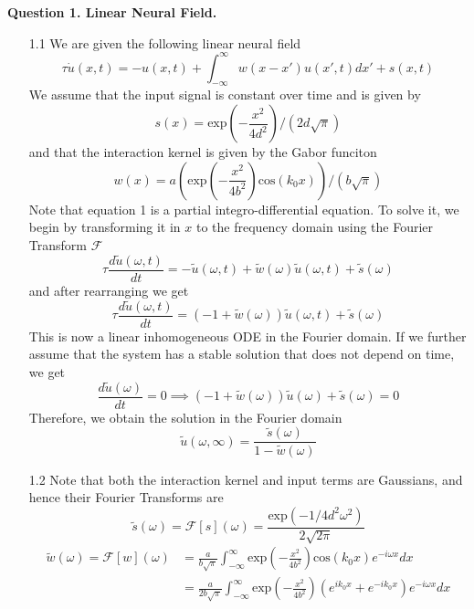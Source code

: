 \documentclass[12pt]{article}
\begin{document}
\noindent


\noindent\textbf{Question 1. Linear Neural Field.}
\begin{enumerate}
\item[1.1] We are given the following linear neural field
\begin{equation}
    \tau \dot{u}(x, t) =   -u(x, t) + \int_{-\infty}^{\infty}w(x-x')u(x', t)dx' + s(x, t)
\end{equation}
We assume that the input signal is constant over time and is given by 
\begin{equation}
    s(x) = \text{exp}\left(-\frac{x^2}{4d^2}\right)/(2d\sqrt{\pi})
\end{equation}
and that the interaction kernel is given by the Gabor funciton
\begin{equation}
    w(x) = a\left(\text{exp}\left(-\frac{x^2}{4b^2}\right)\text{cos}(k_{0}x)\right)/(b\sqrt{\pi})
\end{equation}
Note that equation 1 is a partial integro-differential equation. To solve it, we begin by transforming it in $x$ to the 
frequency domain using the Fourier Transform $\mathcal{F}$
\[
    \tau \frac{d\widetilde{u}(\omega, t)}{dt} = -\widetilde{u}(\omega, t) + \widetilde{w}(\omega)\widetilde{u}(\omega, t) + \widetilde{s}(\omega)
\]
and after rearranging we get
\[
    \tau \frac{d\widetilde{u}(\omega, t)}{dt} = (-1 + \widetilde{w}(\omega))\widetilde{u}(\omega, t) + \widetilde{s}(\omega)
\]
This is now a linear inhomogeneous ODE in the Fourier domain. If we further assume that the system has a stable solution that does not depend on time,
we get
\[
    \frac{d\widetilde{u}(\omega)}{dt} = 0 \implies (-1 + \widetilde{w}(\omega))\widetilde{u}(\omega) + \widetilde{s}(\omega) = 0
\]
Therefore, we obtain the solution in the Fourier domain
\[
    \widetilde{u}(\omega, \infty) = \frac{\widetilde{s}(\omega)}{1 - \widetilde{w}(\omega)}
\]
\item[1.2] Note that both the interaction kernel and input terms are Gaussians, and hence their Fourier Transforms are 
\[
    \widetilde{s}(\omega) = \mathcal{F}[s](\omega) =  \frac{\text{exp}(-1/4d^{2}\omega^{2})}{2\sqrt{2\pi}}
\]
\begin{align*}
    \widetilde{w}(\omega) = \mathcal{F}[w](\omega) &= \frac{a}{b\sqrt{\pi}}\int_{-\infty}^{\infty}\text{exp}\left(-\frac{x^2}{4b^{2}}\right)\text{cos}(k_{0}x)e^{-i\omega x}dx\\
                           &= \frac{a}{2b\sqrt{\pi}}\int_{-\infty}^{\infty}\text{exp}\left(-\frac{x^2}{4b^{2}}\right)(e^{ik_{0}x}+e^{-ik_{0}x})e^{-i\omega x}dx\\

\end{align*}
\end{enumerate}
\end{document}
